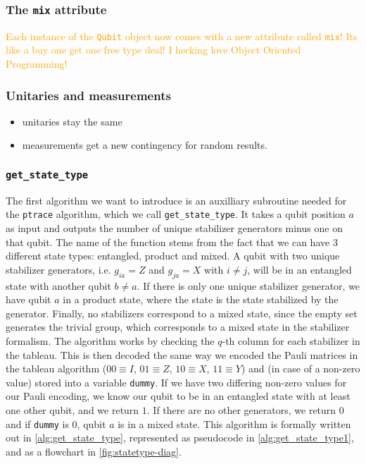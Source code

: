 \subsubsection{The \texttt{mix} attribute}
\textcolor{orange}{Each instance of the \texttt{Qubit} object now comes with a
new attribute called \texttt{mix}! Its like a buy one get one free type deal! I
hecking love Object Oriented Programming!}

\subsubsection{Unitaries and measurements}
\begin{itemize}
  \item unitaries stay the same
  \item measurements get a new contingency for random results.
\end{itemize}
\subsubsection{\texttt{get\_state\_type}}
The first algorithm we want to introduce is an auxilliary subroutine needed for
the \texttt{ptrace} algorithm, which we call \texttt{get\_state\_type}. It
takes a qubit position $a$ as input and outputs the number of unique stabilizer
generators minus one on that qubit. The name of the function stems from the
fact that we can have $3$ different state types: entangled, product and mixed.
A qubit with two unique stabilizer generators, i.e. $g_{ia} = Z$ and $g_{ja} =
X$ with $i\neq j$, will be in an entangled state with another qubit $b\neq a$.
If there is only one unique stabilizer generator, we have qubit $a$ in a
product state, where the state is the state stabilized by the generator.
Finally, no stabilizers correspond to a mixed state, since the empty set
generates the trivial group, which corresponds to a mixed state in the
stabilizer formalism. The algorithm works by checking the $q$-th column for
each stabilizer in the tableau. This is then decoded the same way we encoded
the Pauli matrices in the tableau algorithm ($00 \equiv I$, $01\equiv Z$, $10
\equiv X$, $11 \equiv Y$) and (in case of a non-zero value) stored into a
variable \texttt{dummy}. If we have two differing non-zero values for our Pauli
encoding, we know our qubit to be in an entangled state with at least one other
qubit, and we return $1$. If there are no other generators, we return $0$ and
if \texttt{dummy} is $0$, qubit $a$ is in a mixed state. This algorithm is
formally written out in \cref{alg:get_state_type},
represented as pseudocode in \cref{alg:get_state_type1}, and as a flowchart in
\cref{fig:statetype-diag}.


